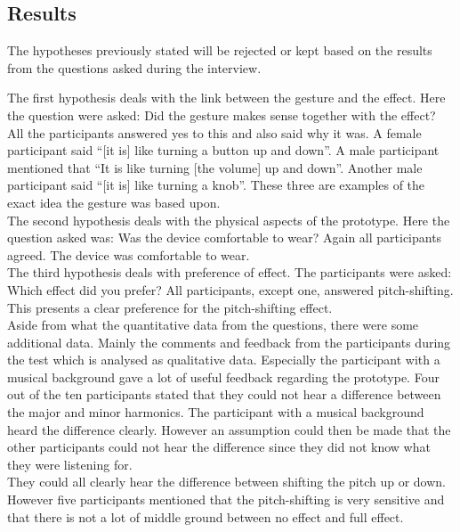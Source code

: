 \subsection{Results}
The hypotheses previously stated will be rejected or kept based on the results from the questions asked during the interview.

The first hypothesis deals with the link between the gesture and the effect. Here the question were asked: Did the gesture makes sense together with the effect? All the participants answered yes to this and also said why it was. A female participant said “[it is] like turning a button up and down”. A male participant mentioned that “It is like turning [the volume] up and down”. Another male participant said “[it is] like turning a knob”. These three are examples of the exact idea the gesture was based upon.\\ 

The second hypothesis deals with the physical aspects of the prototype. Here the question asked was: Was the device comfortable to wear? Again all participants agreed. The device was comfortable to wear. \\

The third hypothesis deals with preference of effect. The participants were asked: Which effect did you prefer? All participants, except one, answered pitch-shifting. This presents a clear preference for the pitch-shifting effect. \\

Aside from what the quantitative data from the questions, there were some additional data. Mainly the comments and feedback from the participants during the test which is analysed as qualitative data. Especially the participant with a musical background gave a lot of useful feedback regarding the prototype. Four out of the ten participants stated that they could not hear a difference between the major and minor harmonics. The participant with a musical background heard the difference clearly. However an assumption could then be made that the other participants could not hear the difference since they did not know what they were listening for. \\

They could all clearly hear the difference between shifting the pitch up or down. However five participants mentioned that the pitch-shifting is very sensitive and that there is not a lot of middle ground between no effect and full effect. \\

